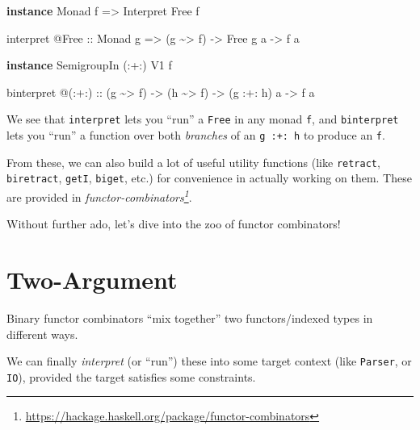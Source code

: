 \documentclass[]{article}
\newenvironment{Shaded}{}{}
\newcommand{\DataTypeTok}[1]{\textcolor[rgb]{0.56,0.13,0.00}{#1}}
\newcommand{\KeywordTok}[1]{\textcolor[rgb]{0.00,0.44,0.13}{\textbf{#1}}}
\newcommand{\NormalTok}[1]{#1}
\newcommand{\OperatorTok}[1]{\textcolor[rgb]{0.40,0.40,0.40}{#1}}
\newcommand{\OtherTok}[1]{\textcolor[rgb]{0.00,0.44,0.13}{#1}}
\renewcommand{\href}[2]{#2\footnote{\url{#1}}}
\begin{document}
\begin{Shaded}
\begin{Highlighting}[]
\KeywordTok{instance} \DataTypeTok{Monad}\NormalTok{ f }\OtherTok{=\textgreater{}} \DataTypeTok{Interpret} \DataTypeTok{Free}\NormalTok{ f}

\NormalTok{interpret }\OperatorTok{@}\DataTypeTok{Free}
\OtherTok{    ::} \DataTypeTok{Monad}\NormalTok{ g}
    \OtherTok{=\textgreater{}}\NormalTok{ (g }\OperatorTok{\textasciitilde{}\textgreater{}}\NormalTok{ f)}
    \OtherTok{{-}\textgreater{}} \DataTypeTok{Free}\NormalTok{ g a}
    \OtherTok{{-}\textgreater{}}\NormalTok{ f a}

\KeywordTok{instance} \DataTypeTok{SemigroupIn}\NormalTok{ (}\OperatorTok{:+:}\NormalTok{) }\DataTypeTok{V1}\NormalTok{ f}

\NormalTok{binterpret }\OperatorTok{@}\NormalTok{(}\OperatorTok{:+:}\NormalTok{)}
\OtherTok{    ::}\NormalTok{ (g }\OperatorTok{\textasciitilde{}\textgreater{}}\NormalTok{ f)}
    \OtherTok{{-}\textgreater{}}\NormalTok{ (h }\OperatorTok{\textasciitilde{}\textgreater{}}\NormalTok{ f)}
    \OtherTok{{-}\textgreater{}}\NormalTok{ (g }\OperatorTok{:+:}\NormalTok{ h) a}
    \OtherTok{{-}\textgreater{}}\NormalTok{ f a}
\end{Highlighting}
\end{Shaded}

We see that \texttt{interpret} lets you ``run'' a \texttt{Free} in any monad
\texttt{f}, and \texttt{binterpret} lets you ``run'' a function over both
\emph{branches} of an \texttt{g\ :+:\ h} to produce an \texttt{f}.

From these, we can also build a lot of useful utility functions (like
\texttt{retract}, \texttt{biretract}, \texttt{getI}, \texttt{biget}, etc.) for
convenience in actually working on them. These are provided in
\emph{\href{https://hackage.haskell.org/package/functor-combinators}{functor-combinators}}.

Without further ado, let's dive into the zoo of functor combinators!

\section{Two-Argument}\label{two-argument}

Binary functor combinators ``mix together'' two functors/indexed types in
different ways.

We can finally \emph{interpret} (or ``run'') these into some target context
(like \texttt{Parser}, or \texttt{IO}), provided the target satisfies some
constraints.
\end{document}
